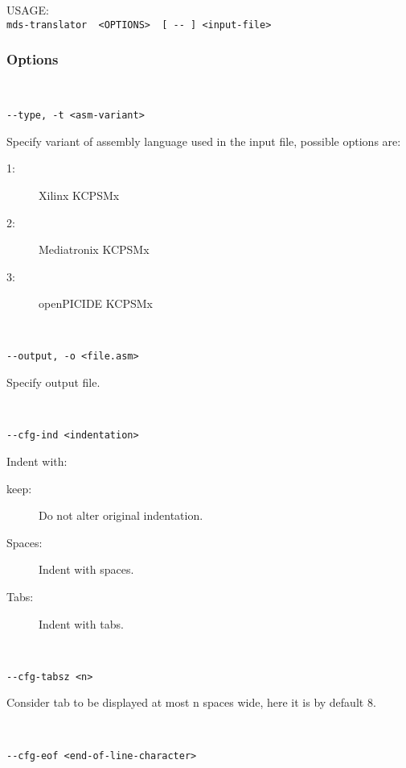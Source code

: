             USAGE:
            {
                ~\\
                \usecodefont
                \verb'mds-translator  <OPTIONS>  [ -- ] <input-file>'\\
            }
            \subsubsection{Options}
                {
                ~\\
                \usecodefont

                \verb'--type, -t <asm-variant>'\\
                }
                Specify variant of assembly language used in the input file, possible options are:
                \begin{description}
                  \item [1:] Xilinx KCPSMx
                  \item [2:] Mediatronix KCPSMx
                  \item [3:] openPICIDE KCPSMx
                \end{description}
                {
                ~\\
                \usecodefont

                \verb'--output, -o <file.asm>'\\
                }
                Specify output file.
                {
                ~\\
                \usecodefont

                \verb'--cfg-ind <indentation>'\\
                }
                Indent with:
                \begin{description}
                 \item [keep:] Do not alter original indentation.
                 \item [Spaces:] Indent with spaces.
                 \item [Tabs:] Indent with tabs.
                \end{description}
                {
                ~\\
                \usecodefont

                \verb'--cfg-tabsz <n>'\\
                }
                Consider tab to be displayed at most n spaces wide, here it is by default 8.
                {
                ~\\
                \usecodefont

                \verb'--cfg-eof <end-of-line-character>'\\
                }
